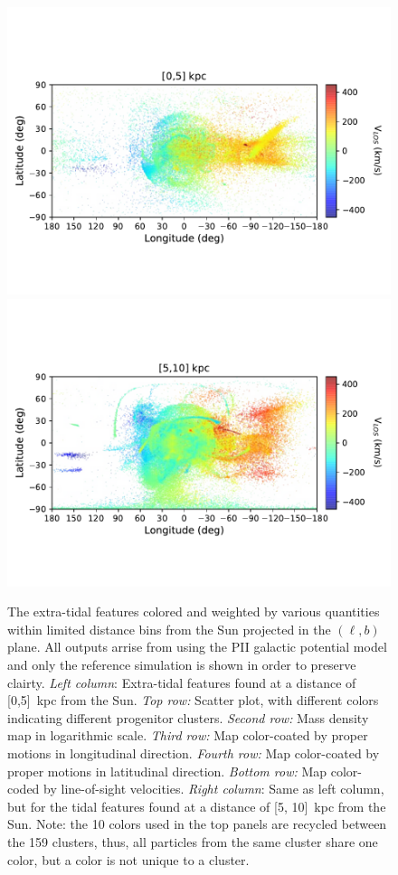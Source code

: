 \begin{figure}[h!]
\begin{center}
            \includegraphics[clip=true, trim = 0mm 20mm 0mm 20mm, width=0.9\columnwidth]{images/PII_ensemble_LB_D0-5_RV_new.pdf}
            \includegraphics[clip=true, trim = 0mm 20mm 0mm 20mm, width=0.9\columnwidth]{images/PII_ensemble_LB_D5-10_RV_new.pdf}
        \end{center}
        \caption[]{The extra-tidal features colored and weighted by various quantities within limited distance bins from the Sun projected in the $(\ell, b)$ plane. All outputs arrise from using the PII galactic potential model and only the reference simulation is shown in order to preserve clairty. \emph{Left column}: Extra-tidal features found at a distance of [0,5]~kpc from the Sun. \emph{Top row:} Scatter plot, with different colors indicating different progenitor clusters. \emph{Second row:} Mass density map in logarithmic scale. \emph{Third row:} Map color-coated by proper motions in longitudinal direction.    \emph{Fourth row:} Map color-coated by proper motions in latitudinal direction.  \emph{Bottom row:} Map color-coded by line-of-sight velocities. \emph{Right column}: Same as left column, but for the tidal features found at a distance of [5, 10]~kpc from the Sun. Note: the 10 colors used in the top panels are recycled between the 159 clusters, thus, all particles from the same cluster share one color, but a color is not unique to a cluster. }\label{D0-10}
    \end{figure}
    \onecolumn

